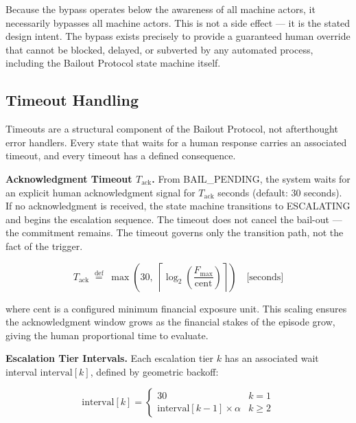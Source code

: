 \bigskip

\bigskip

Because the bypass operates below the awareness of all machine actors, it necessarily bypasses all machine actors. This is not a side effect — it is the stated design intent. The bypass exists precisely to provide a guaranteed human override that cannot be blocked, delayed, or subverted by any automated process, including the Bailout Protocol state machine itself.

\bigskip

\subsection{Timeout Handling}

Timeouts are a structural component of the Bailout Protocol, not afterthought error handlers. Every state that waits for a human response carries an associated timeout, and every timeout has a defined consequence.

\bigskip

\bigskip

\noindent\textbf{Acknowledgment Timeout $T_{\text{ack}}$.} From BAIL\_PENDING, the system waits for an explicit human acknowledgment signal for $T_{\text{ack}}$ seconds (default: 30 seconds). If no acknowledgment is received, the state machine transitions to ESCALATING and begins the escalation sequence. The timeout does not cancel the bail-out — the commitment remains. The timeout governs only the transition path, not the fact of the trigger.

\bigskip

\bigskip

\[
T_{\text{ack}} \;\overset{\text{def}}{=} \; \max\left(30,\; \left\lceil \log_2\left(\frac{F_{\text{max}}}{\text{cent}}\right)\right\rceil \right) \quad \text{[seconds]}
\]

where $\text{cent}$ is a configured minimum financial exposure unit. This scaling ensures the acknowledgment window grows as the financial stakes of the episode grow, giving the human proportional time to evaluate.

\bigskip

\noindent\textbf{Escalation Tier Intervals.} Each escalation tier $k$ has an associated wait interval $\text{interval}[k]$, defined by geometric backoff:

\[
\text{interval}[k] = \begin{cases}
30 & k = 1 \\
\text{interval}[k-1] \times \alpha & k \geq 2
\end{cases}
\]

